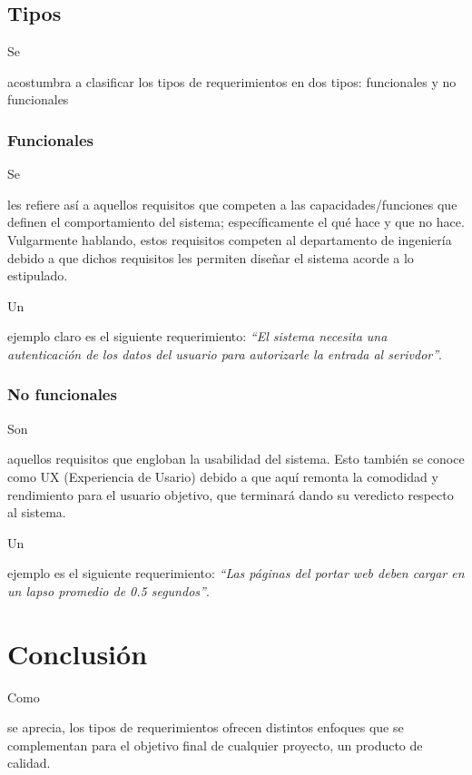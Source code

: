 \documentclass[stu, 12pt, letterpaper, donotrepeattitle, floatsintext, natbib]{apa7}
\begin{document}
\subsection{Tipos}
Se \begin{justifying}
    acostumbra a clasificar los tipos de requerimientos en dos tipos: funcionales y no funcionales \citep{altexsoft-2019, bigelow-2020}\par %
\end{justifying}
\subsubsection{Funcionales}
Se \begin{justifying}
    les refiere así a aquellos requisitos que competen a las capacidades/funciones que definen el comportamiento del sistema; específicamente el qué hace y que no hace.
    Vulgarmente hablando, estos requisitos competen al departamento de ingeniería debido a que dichos requisitos les permiten diseñar el sistema acorde a lo estipulado. \citep{altexsoft-2019, bigelow-2020}\par
\end{justifying}
Un \begin{justifying}
    ejemplo claro es el siguiente requerimiento: \emph{``El sistema necesita una autenticación de los datos del usuario para autorizarle la entrada al serivdor''}.
\end{justifying}
\vspace{\baselineskip}
\subsubsection{No funcionales}
Son \begin{justifying}
    aquellos requisitos que engloban la usabilidad del sistema. Esto también se conoce como UX (Experiencia de Usario) debido a que aquí
    remonta la comodidad y rendimiento para el usuario objetivo, que terminará dando su veredicto respecto al sistema. \citep{altexsoft-2019, bigelow-2020} \par
\end{justifying}
Un \begin{justifying}
    ejemplo es el siguiente requerimiento: \emph{``Las páginas del portar web deben cargar en un lapso promedio de 0.5 segundos''}.\par
\end{justifying}
\vspace{\baselineskip}
\section{Conclusión}
Como \begin{justifying}
    se aprecia, los tipos de requerimientos ofrecen distintos enfoques que se complementan para el objetivo final de cualquier proyecto, un producto de calidad.\par
\end{justifying}
\renewcommand\refname{\textbf{Referencias}}
\end{document}

